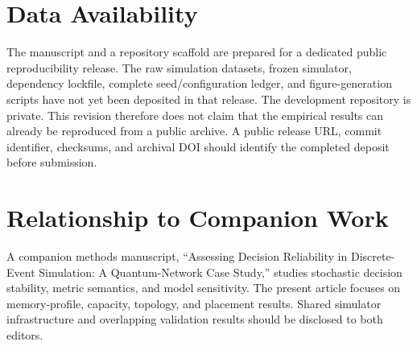 \documentclass[quantumrep,article,submit,moreauthors]{Definitions/mdpi}
\begin{document}
\section*{Data Availability}

The manuscript and a repository scaffold are prepared for a dedicated public reproducibility release. The raw simulation datasets, frozen simulator, dependency lockfile, complete seed/configuration ledger, and figure-generation scripts have not yet been deposited in that release. The development repository is private. This revision therefore does not claim that the empirical results can already be reproduced from a public archive. A public release URL, commit identifier, checksums, and archival DOI should identify the completed deposit before submission.

\section*{Relationship to Companion Work}

A companion methods manuscript, ``Assessing Decision Reliability in Discrete-Event Simulation: A Quantum-Network Case Study,'' studies stochastic decision stability, metric semantics, and model sensitivity. The present article focuses on memory-profile, capacity, topology, and placement results. Shared simulator infrastructure and overlapping validation results should be disclosed to both editors.





\end{document}

